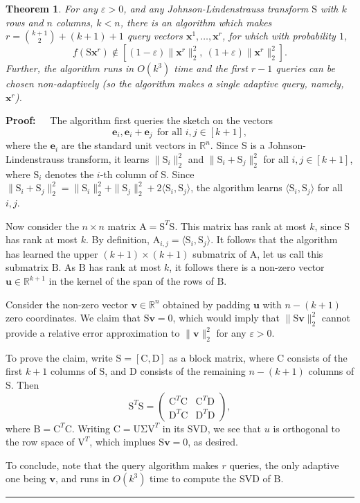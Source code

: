 \documentclass[11pt]{article}
\newtheorem{theorem}{Theorem}
\newenvironment{proof}{\begin{trivlist} \item {\bf Proof:~~}}
  {\qed\end{trivlist}}
\newcommand{\mat}[1]{{\ensuremath{\bm{\mathrm{#1}}}}}
\def\e{{\mathbf e}}
\def\u{{\mathbf u}}
\def\ve{{\mathbf v}}
\def\matA{\mat{A}}
\def\matB{\mat{B}}
\def\matC{\mat{C}}
\def\matD{\mat{D}}
\def\matS{\mat{S}}
\def\matU{\mat{U}}
\def\matV{\mat{V}}
\def\qed{\hfill\rule{2mm}{2mm}}
\def\x{{\mathbf x}}
\newcommand{\eps}{\varepsilon}
\begin{document}
\begin{theorem}\label{thm:jlBreak}
For any $\eps > 0$, and any Johnson-Lindenstrauss transform $\matS$ with $k$ rows and $n$ columns, $k < n$, 
there is an algorithm which makes
$r = \binom{k+1}{2} + (k+1) + 1$ query vectors $\x^1, \ldots, \x^r$, for which with probability $1$, 
$$f(\matS\x^r) \notin \left [(1-\eps)\|\x^r\|^2_2, \ (1+\eps)\|\x^r\|^2_2 \right ].$$
Further, the algorithm runs in $O(k^3)$ time and the first $r-1$ queries can be chosen 
non-adaptively (so the algorithm makes a single adaptive query, namely, $\x^r$). 
\end{theorem}
\begin{proof}
The algorithm first queries the sketch on the vectors
$$\e_i, \e_{i}+\e_j \ \ \textrm{for all } i,j \in [k+1],$$
where the $\e_i$ are the standard unit vectors in $\mathbb{R}^n$. Since $\matS$ is a Johnson-Lindenstrauss
transform, it learns $\|\matS_i\|_2^2$ and $\|\matS_i + \matS_j\|_2^2$ for all $i,j \in [k+1]$, where $\matS_i$
denotes the $i$-th column of $\matS$. Since
$\|\matS_i +\matS_j\|_2^2 = \|\matS_i\|_2^2 + \|\matS_j\|_2^2 + 2\langle \matS_i, \matS_j \rangle$, the algorithm learns 
$\langle \matS_i, \matS_j \rangle$ for all $i,j$. 

Now consider the $n \times n$ matrix $\matA = \matS^T\matS$. This matrix
has rank at most $k$, since $\matS$ has rank at most $k$. By definition, $\matA_{i,j} = \langle \matS_i, \matS_j \rangle$. 
It follows that the algorithm has learned the upper $(k+1) \times (k+1)$ submatrix of $\matA$, let us call
this submatrix $\matB$. As $\matB$ has rank at most $k$, it follows there is a non-zero vector $\u \in \mathbb{R}^{k+1}$ 
in the kernel of the span of the rows of $\matB$. 

Consider the non-zero vector $\ve \in \mathbb{R}^n$ obtained by padding $\u$ with $n-(k+1)$ zero coordinates. 
We claim that $\matS \ve = 0$, which would imply that $\|\matS \ve\|_2^2$ cannot provide a relative error approximation
to $\|\ve\|_2^2$ for any $\eps > 0$. 

To prove the claim, write $\matS = [\matC, \matD]$ as a block matrix, where $\matC$ consists of the first $k+1$ columns
of $\matS$, and $\matD$ consists of the remaining $n-(k+1)$ columns of $\matS$. Then
\[ \matS^T\matS = \left ( \begin{array}{cc}
\matC^T\matC & \matC^T\matD\\
\matD^T\matC & \matD^T\matD \end{array} \right ), \]
where $\matB = \matC^T\matC$. Writing $\matC = \matU \mat\Sigma \matV^T$ in its SVD, we see that $u$ is orthogonal to the row space
of $\matV^T$, which implues $\matS \ve = 0$, as desired. 

To conclude, note that the query algorithm makes $r$ queries, the only adaptive one being $\ve$, and runs
in $O(k^3)$ time to compute the SVD of $\matB$. 
\end{proof}
\end{document}

